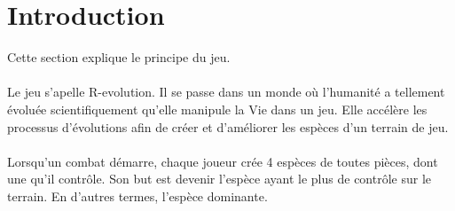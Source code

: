 \section{Introduction}
Cette section explique le principe du jeu. 
\\\\
Le jeu s'apelle R-evolution. Il se passe dans un monde où l'humanité a tellement évoluée scientifiquement qu'elle manipule la Vie dans un jeu. Elle accélère les processus d'évolutions afin de créer et d'améliorer les espèces d'un terrain de jeu.
\\\\
Lorsqu'un combat démarre, chaque joueur crée 4 espèces de toutes pièces, dont une qu'il contrôle. Son but est devenir l'espèce ayant le plus de contrôle sur le terrain. En d'autres termes, l'espèce dominante.
